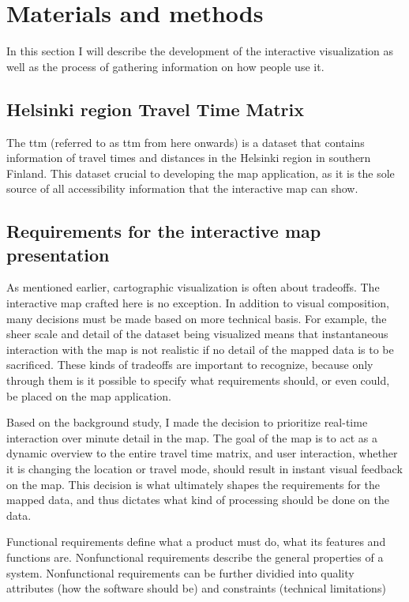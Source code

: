 \section{Materials and methods}
In this section I will describe the development of the interactive visualization
as well as the process of gathering information on how people use it.

\subsection{Helsinki region Travel Time Matrix}
The \acrlong{ttm} (referred to as \acrshort{ttm} from here onwards)
is a dataset that contains information of travel times and distances
in the Helsinki region in southern Finland.
This dataset crucial to developing the map application,
as it is the sole source of all accessibility information that the interactive map can show.

\subsection{Requirements for the interactive map presentation}

As mentioned earlier, cartographic visualization is often about tradeoffs.
The interactive map crafted here is no exception.
In addition to visual composition,  %
many decisions must be made based on more technical basis.
For example, the sheer scale and detail of the dataset being visualized
means that instantaneous interaction with the map is not realistic
if no detail of the mapped data is to be sacrificed.
These kinds of tradeoffs are important to recognize,
because only through them is it possible to specify what
requirements should, or even could, be placed on the map application.

Based on the background study,  %
I made the decision to prioritize real-time interaction over minute detail in the map.
The goal of the map is to act as a dynamic overview to the entire travel time matrix,
and user interaction, whether it is changing the location or travel mode,
should result in instant visual feedback on the map.
This decision is what ultimately shapes the requirements for the mapped data,
and thus dictates what kind of processing should be done on the data.

Functional requirements define what a product must do,
what its features and functions are.
Nonfunctional requirements describe the general properties of a system.
Nonfunctional requirements can be further dividied into quality attributes
(how the software should be) and constraints (technical limitations)

